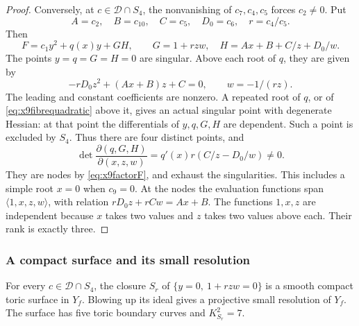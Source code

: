 \begin{proof}
Conversely, at $c\in\mathcal D\cap S_4$, the nonvanishing of
$c_7,c_4,c_5$ forces $c_2\ne0$. Put
\begin{equation}\label{eq:x9factorparameters}
 A=c_2,\quad B=c_{10},\quad C=c_5,\quad D_0=c_6,\quad
 r=c_4/c_5.
\end{equation}
Then
\begin{equation}\label{eq:x9factorF}
 F=c_1y^2+q(x)y+G H,\qquad
 G=1+rzw,\quad H=Ax+B+C/z+D_0/w.
\end{equation}
The points $y=q=G=H=0$ are singular. Above each root of $q$, they are
given by
\begin{equation}\label{eq:x9fibrequadratic}
 -rD_0z^2+(Ax+B)z+C=0,\qquad w=-1/(rz).
\end{equation}
The leading and constant coefficients are nonzero. A repeated root of
$q$, or of \eqref{eq:x9fibrequadratic} above it, gives an actual singular
point with degenerate Hessian: at that point the differentials of
$y,q,G,H$ are dependent. Such a point is excluded by $S_4$. Thus there
are four distinct points, and
\begin{equation}\label{eq:x9nodejacobian}
 \det\frac{\partial(q,G,H)}{\partial(x,z,w)}
       =q'(x)r(C/z-D_0/w)\ne0.
\end{equation}
They are nodes by \eqref{eq:x9factorF}, and exhaust the singularities.
This includes a simple root $x=0$ when $c_9=0$.
At the nodes the evaluation functions span $\langle1,x,z,w\rangle$,
with relation $rD_0z+rCw=Ax+B$. The functions $1,x,z$ are independent
because $x$ takes two values and $z$ takes two values above each. Their
rank is exactly three.
\end{proof}

\subsubsection*{A compact surface and its small resolution}

\begin{lemma}\label{lem:x9surface}
For every $c\in\mathcal D\cap S_4$, the closure $S_r$ of
$\{y=0,\ 1+rzw=0\}$ is a smooth compact toric surface in $Y_f$.
Blowing up its ideal gives a projective small resolution of $Y_f$.
The surface has five toric boundary curves and $K_{S_r}^2=7$.
\end{lemma}

